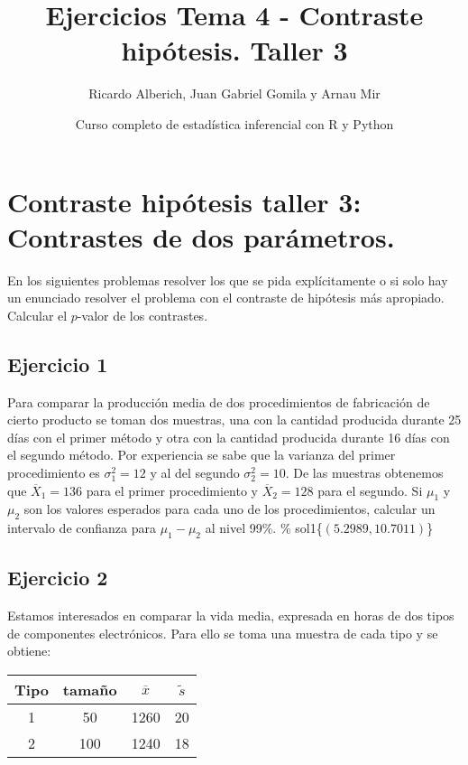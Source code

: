 \documentclass[
]{article}
\title{Ejercicios Tema 4 - Contraste hipótesis. Taller 3}
\author{Ricardo Alberich, Juan Gabriel Gomila y Arnau Mir}
\date{Curso completo de estadística inferencial con R y Python}
\begin{document}
\maketitle

{
\hypersetup{linkcolor=blue}
\setcounter{tocdepth}{2}
\tableofcontents
}
\hypertarget{contraste-hipuxf3tesis-taller-3-contrastes-de-dos-paruxe1metros.}{%
\section{Contraste hipótesis taller 3: Contrastes de dos
parámetros.}\label{contraste-hipuxf3tesis-taller-3-contrastes-de-dos-paruxe1metros.}}

En los siguientes problemas resolver los que se pida explícitamente o si
solo hay un enunciado resolver el problema con el contraste de hipótesis
más apropiado. Calcular el \(p\)-valor de los contrastes.

\hypertarget{ejercicio-1}{%
\subsection{Ejercicio 1}\label{ejercicio-1}}

Para comparar la producción media de dos procedimientos de fabricación
de cierto producto se toman dos muestras, una con la cantidad producida
durante 25 días con el primer método y otra con la cantidad producida
durante 16 días con el segundo método. Por experiencia se sabe que la
varianza del primer procedimiento es \(\sigma_{1}^2=12\) y al del
segundo \(\sigma_{2}^2=10\). De las muestras obtenemos que
\(\overline{X}_{1}=136\) para el primer procedimiento y
\(\overline{X}_{2}=128\) para el segundo. Si \(\mu_{1}\) y \(\mu_{2}\)
son los valores esperados para cada uno de los procedimientos, calcular
un intervalo de confianza para \(\mu_{1}-\mu_{2}\) al nivel 99\%. \%
sol1\{\(\left(5.2989,10.7011\right)\)\}

\hypertarget{ejercicio-2}{%
\subsection{Ejercicio 2}\label{ejercicio-2}}

Estamos interesados en comparar la vida media, expresada en horas de dos
tipos de componentes electrónicos. Para ello se toma una muestra de cada
tipo y se obtiene:

\begin{center}
\begin{tabular}{|c|c|c|c|}
\hline Tipo & tamaño & $\overline{x}$ & $\tilde{s}$\\ \hline \hline 1 & 50 & 1260 & 20\\ \hline 2 &
100 & 1240 & 18\\ \hline
\end{tabular}
\end{center}
\end{document}
